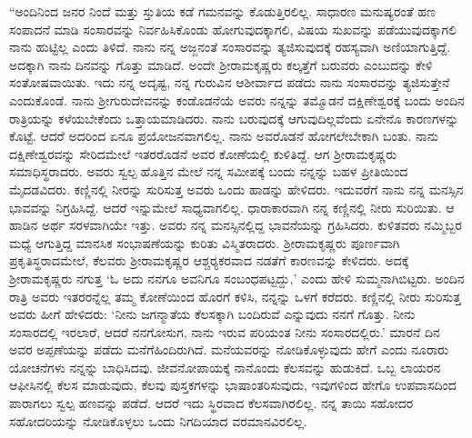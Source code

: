 \vskip  3pt

“ಅಂದಿನಿಂದ ಜನರ ನಿಂದೆ ಮತ್ತು ಸ್ತುತಿಯ ಕಡೆ ಗಮನವನ್ನು ಕೊಡುತ್ತಿರಲಿಲ್ಲ. ಸಾಧಾರಣ ಮನುಷ್ಯರಂತೆ ಹಣ ಸಂಪಾದನೆ ಮಾಡಿ ಸಂಸಾರವನ್ನು ನಿರ್ವಹಿಸಿಕೊಂಡು ಹೋಗುವುದಕ್ಕಾಗಲಿ, ವಿಷಯ ಸುಖವನ್ನು ಪಡೆಯುವುದಕ್ಕಾಗಲಿ ನಾನು ಹುಟ್ಟಿಲ್ಲ ಎಂದು ತಿಳಿದೆ. ನಾನು ನನ್ನ ಅಜ್ಜನಂತೆ ಸಂಸಾರವನ್ನು ತ್ಯಜಿಸುವುದಕ್ಕೆ ರಹಸ್ಯವಾಗಿ ಅಣಿಯಾಗುತ್ತಿದ್ದೆ. ಅದಕ್ಕಾಗಿ ನಾನು ದಿನವನ್ನು ಗೊತ್ತು ಮಾಡಿದೆ. ಅಂದೇ ಶ‍್ರೀರಾಮಕೃಷ್ಣರು ಕಲ್ಕತ್ತೆಗೆ ಬರುವರು ಎಂಬುದನ್ನು ಕೇಳಿ ಸಂತೋಷವಾಯಿತು. ಇದು ನನ್ನ ಅದೃಷ್ಟ, ನನ್ನ ಗುರುವಿನ ಆಶೀರ್ವಾದ ಪಡೆದು ನಾನು ಸಂಸಾರವನ್ನು ತ್ಯಜಿಸುತ್ತೇನೆ ಎಂದುಕೊಂಡೆ. ನಾನು ಶ‍್ರೀಗುರುದೇವನನ್ನು ಕಂಡೊಡನೆಯೆ ಅವರು ನನ್ನನ್ನು ತಮ್ಮೊಡನೆ ದಕ್ಷಿಣೇಶ್ವರಕ್ಕೆ ಬಂದು ಅಂದಿನ ರಾತ್ರಿಯನ್ನು ಕಳೆಯಬೇಕೆಂದು ಒತ್ತಾಯಮಾಡಿದರು. ನಾನು ಬರುವುದಕ್ಕೆ ಆಗುವುದಿಲ್ಲವೆಂದು ಏನೇನೊ ಕಾರಣಗಳನ್ನು ಕೊಟ್ಟೆ. ಆದರೆ ಅದರಿಂದ ಏನೂ ಪ್ರಯೋಜನವಾಗಲಿಲ್ಲ. ನಾನು ಅವರೊಡನೆ ಹೋಗಲೇಬೇಕಾಗಿ ಬಂತು. ನಾನು ದಕ್ಷಿಣೇಶ್ವರವನ್ನು ಸೇರಿದಮೇಲೆ ಇತರರೊಡನೆ ಅವರ ಕೋಣೆಯಲ್ಲಿ ಕುಳಿತಿದ್ದೆ. ಆಗ ಶ‍್ರೀರಾಮಕೃಷ್ಣರು ಸಮಾಧಿಸ್ಥರಾದರು. ಅವರು ಸ್ವಲ್ಪ ಹೊತ್ತಿನ ಮೇಲೆ ನನ್ನ ಸಮೀಪಕ್ಕೆ ಬಂದು ನನ್ನನ್ನು ಬಹಳ ಪ್ರೀತಿಯಿಂದ ಮೈದಡವಿದರು. ಕಣ್ಣಿನಲ್ಲಿ ನೀರನ್ನು ಸುರಿಸುತ್ತ ಅವರು ಒಂದು ಹಾಡನ್ನು ಹೇಳಿದರು. ಇದುವರೆಗೆ ನಾನು ನನ್ನ ಮನಸ್ಸಿನ ಭಾವವನ್ನು ನಿಗ್ರಹಿಸಿದ್ದೆ. ಆದರೆ ಇನ್ನುಮೇಲೆ ಸಾಧ್ಯವಾಗಲಿಲ್ಲ. ಧಾರಾಕಾರವಾಗಿ ನನ್ನ ಕಣ್ಣಿನಲ್ಲಿ ನೀರು ಸುರಿಯಿತು. ಆ ಹಾಡಿನ ಅರ್ಥ ಸರಳವಾಗಿಯೇ ಇತ್ತು. ಅವರು ನನ್ನ ಮನಸ್ಸಿನಲ್ಲಿದ್ದ ಭಾವನೆಯನ್ನು ಗ್ರಹಿಸಿದರು. ಕುಳಿತವರು ನಮ್ಮಿಬ್ಬರ ಮಧ್ಯೆ ಆಗುತ್ತಿದ್ದ ಮಾನಸಿಕ ಸಂಭಾಷಣೆಯನ್ನು ಕುರಿತು ವಿಸ್ಮಿತರಾದರು. ಶ‍್ರೀರಾಮಕೃಷ್ಣರು ಪೂರ್ಣವಾಗಿ ಪ್ರಕೃತಿಸ್ಥರಾದಮೇಲೆ, ಕೆಲವರು ಶ‍್ರೀರಾಮಕೃಷ್ಣರ ಆಶ್ಚರ‍್ಯಕರವಾದ ನಡತೆಗೆ ಕಾರಣವನ್ನು ಕೇಳಿದರು. ಅದಕ್ಕೆ ಶ‍್ರೀರಾಮಕೃಷ್ಣರು ನಗುತ್ತ ‘ಓ ಅದು ನನಗೂ ಅವನಿಗೂ ಸಂಬಂಧಪಟ್ಟದ್ದು,’ ಎಂದು ಹೇಳಿ ಸುಮ್ಮನಾಗಿಬಿಟ್ಟರು. ಅಂದಿನ ರಾತ್ರಿ ಅವರು ಇತರರನ್ನೆಲ್ಲ ತಮ್ಮ ಕೋಣೆಯಿಂದ ಹೊರಗೆ ಕಳಿಸಿ, ನನ್ನನ್ನು ಒಳಗೆ ಕರೆದರು. ಕಣ್ಣಿನಲ್ಲಿ ನೀರು ಸುರಿಸುತ್ತ ಅವರು ಹೀಗೆ ಹೇಳಿದರು: ‘ನೀನು ಜಗನ್ಮಾತೆಯ ಕೆಲಸಕ್ಕಾಗಿ ಬಂದಿರುವೆ ಎನ್ನುವುದು ನನಗೆ ಗೊತ್ತು. ನೀನು ಸಂಸಾರದಲ್ಲಿ ಇರಲಾರೆ, ಆದರೆ ನನಗೋಸುಗ, ನಾನು ಇರುವ ಪರಿಯಂತ ನೀನು ಸಂಸಾರದಲ್ಲಿರು.’ ಮಾರನೆ ದಿನ ಅವರ ಅಪ್ಪಣೆಯನ್ನು ಪಡೆದು ಮನೆಗೆ\break ಹಿಂದಿರುಗಿದೆ. ಮನೆಯವರನ್ನು ನೋಡಿಕೊಳ್ಳುವುದು ಹೇಗೆ ಎಂದು ನೂರಾರು ಯೋಚನೆಗಳು ನನ್ನನ್ನು ಬಾಧಿಸಿದವು. ಜೀವನೋಪಾಯಕ್ಕೆ ನಾನೊಂದು ಕೆಲಸವನ್ನು ಹುಡುಕಿದೆ. ಒಬ್ಬ ಲಾಯರನ ಆಫೀಸಿನಲ್ಲಿ ಕೆಲಸ ಮಾಡುವುದು, ಕೆಲವು ಪುಸ್ತಕಗಳನ್ನು ಭಾಷಾಂತರಿಸುವುದು, ಇವುಗಳಿಂದ ಹೇಗೊ ಉಪವಾಸದಿಂದ ಪಾರಾಗಲು ಸ್ವಲ್ಪ ಹಣವನ್ನು ಪಡೆದೆ. ಆದರೆ ಇದು ಸ್ಥಿರವಾದ ಕೆಲಸವಾಗಿರಲಿಲ್ಲ. ನನ್ನ ತಾಯಿ ಸಹೋದರ ಸಹೋದರಿಯನ್ನು ನೋಡಿಕೊಳ್ಳಲು ಒಂದು ನಿಗದಿಯಾದ ವರಮಾನವಿರಲಿಲ್ಲ.

\vskip  3pt

